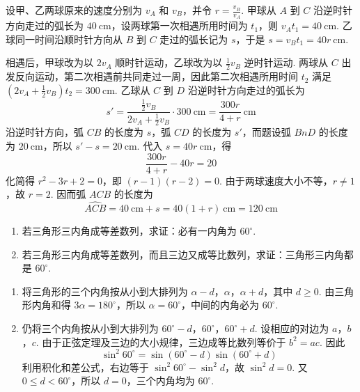 \begin{solution}
设甲、乙两球原来的速度分别为 \(v_A\) 和 \(v_B\)，并令 \(r=\frac{v_B}{v_A}\). 甲球从 \(A\) 到 \(C\) 沿逆时针方向走过的弧长为 \(40\mathrm{~cm}\)，设两球第一次相遇所用时间为 \(t_1\)，则 \(v_A t_1=40\mathrm{~cm}\). 乙球同一时间沿顺时针方向从 \(B\) 到 \(C\) 走过的弧长记为 \(s\)，于是 \(s=v_Bt_1=40r\mathrm{~cm}\).

相遇后，甲球改为以 \(2v_A\) 顺时针运动，乙球改为以 \(\frac{1}{2}v_B\) 逆时针运动. 两球从 \(C\) 出发反向运动，第二次相遇前共同走过一周，因此第二次相遇所用时间 \(t_2\) 满足 \(\left(2v_A+\frac{1}{2}v_B\right)t_2=300\mathrm{~cm}\). 乙球从 \(C\) 到 \(D\) 沿逆时针方向走过的弧长为
\[
s'=\frac{\frac{1}{2}v_B}{2v_A+\frac{1}{2}v_B}\cdot300\mathrm{~cm}=\frac{300r}{4+r}\mathrm{~cm}
\]
沿逆时针方向，弧 \(CB\) 的长度为 \(s\)，弧 \(CD\) 的长度为 \(s'\)，而题设弧 \(BnD\) 的长度为 \(20\mathrm{~cm}\)，所以 \(s'-s=20\mathrm{~cm}\). 代入 \(s=40r\mathrm{~cm}\)，得
\[
\frac{300r}{4+r}-40r=20
\]
化简得 \(r^2-3r+2=0\)，即 \((r-1)(r-2)=0\). 由于两球速度大小不等，\(r\ne1\)，故 \(r=2\). 因而弧 \(ACB\) 的长度为
\[
\widehat{ACB}=40\mathrm{~cm}+s=40(1+r)\mathrm{~cm}=120\mathrm{~cm}
\]
\end{solution}

\begin{problem}
\begin{enumerate}
\item 若三角形三内角成等差数列，求证：必有一内角为 \( 60^\circ \).

\item 若三角形三内角成等差数列，而且三边又成等比数列，求证：三角形三内角都是 \( 60^\circ \).
\end{enumerate}
\end{problem}

\begin{solution}
\begin{enumerate}
\item 将三角形的三个内角按从小到大排列为 \(\alpha-d\)，\(\alpha\)，\(\alpha+d\)，其中 \(d\geqslant0\). 由三角形内角和得 \(3\alpha=180^\circ\)，所以 \(\alpha=60^\circ\)，中间的内角必为 \(60^\circ\).

\item 仍将三个内角按从小到大排列为 \(60^\circ-d\)，\(60^\circ\)，\(60^\circ+d\). 设相应的对边为 \(a\)，\(b\)，\(c\). 由于正弦定理及三边的大小规律，三边成等比数列等价于 \(b^2=ac\). 因此
\[
\sin^2 60^\circ=\sin\left(60^\circ-d\right)\sin\left(60^\circ+d\right)
\]
利用积化和差公式，右边等于 \(\sin^2 60^\circ-\sin^2d\)，故 \(\sin^2d=0\). 又 \(0\leqslant d<60^\circ\)，所以 \(d=0\)，三个内角均为 \(60^\circ\).
\end{enumerate}
\end{solution}

